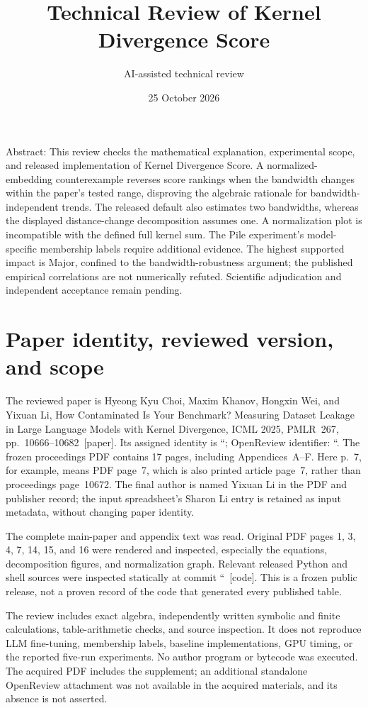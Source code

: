 \documentclass[10pt]{article}
\title{Technical Review of Kernel Divergence Score}
\author{AI-assisted technical review}
\date{25 October 2026}
\begin{document}
\maketitle
Abstract: This review checks the mathematical explanation, experimental scope, and released implementation of Kernel Divergence Score. A normalized-embedding counterexample reverses score rankings when the bandwidth changes within the paper’s tested range, disproving the algebraic rationale for bandwidth-independent trends. The released default also estimates two bandwidths, whereas the displayed distance-change decomposition assumes one. A normalization plot is incompatible with the defined full kernel sum. The Pile experiment’s model-specific membership labels require additional evidence. The highest supported impact is Major, confined to the bandwidth-robustness argument; the published empirical correlations are not numerically refuted. Scientific adjudication and independent acceptance remain pending.\par
\section*{Paper identity, reviewed version, and scope}
The reviewed paper is Hyeong Kyu Choi, Maxim Khanov, Hongxin Wei, and Yixuan Li, How Contaminated Is Your Benchmark? Measuring Dataset Leakage in Large Language Models with Kernel Divergence, ICML 2025, PMLR 267, pp. 10666–10682 [paper]. Its assigned identity is ``; OpenReview identifier: ``. The frozen proceedings PDF contains 17 pages, including Appendices A–F. Here p. 7, for example, means PDF page 7, which is also printed article page 7, rather than proceedings page 10672. The final author is named Yixuan Li in the PDF and publisher record; the input spreadsheet’s Sharon Li entry is retained as input metadata, without changing paper identity.\par
The complete main-paper and appendix text was read. Original PDF pages 1, 3, 4, 7, 14, 15, and 16 were rendered and inspected, especially the equations, decomposition figures, and normalization graph. Relevant released Python and shell sources were inspected statically at commit `` [code]. This is a frozen public release, not a proven record of the code that generated every published table.\par
The review includes exact algebra, independently written symbolic and finite calculations, table-arithmetic checks, and source inspection. It does not reproduce LLM fine-tuning, membership labels, baseline implementations, GPU timing, or the reported five-run experiments. No author program or bytecode was executed. The acquired PDF includes the supplement; an additional standalone OpenReview attachment was not available in the acquired materials, and its absence is not asserted.\par
\end{document}
